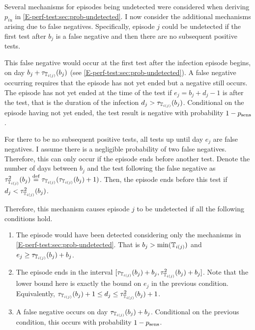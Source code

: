 \documentclass[thesis.tex]{subfiles}
\begin{document}
Several mechanisms for episodes being undetected were considered when deriving $p_{iu}$ in \cref{E-perf-test:sec:prob-undetected}.
I now consider the additional mechanisms arising due to false negatives.
Specifically, episode $j$ could be undetected if the first test after $b_j$ is a false negative and then there are no subsequent positive tests.

This false negative would occur at the first test after the infection episode begins, on day $b_j + \tau_{\mathbb{T}_{i(j)}}(b_j)$ (see \cref{E-perf-test:sec:prob-undetected}).
A false negative occurring requires that the episode has not yet ended but a negative still occurs.
The episode has not yet ended at the time of the test if $e_j = b_j + d_j - 1$ is after the test, that is the duration of the infection $d_j > \tau_{\mathbb{T}_{i(j)}}(b_j)$.
Conditional on the episode having not yet ended, the test result is negative with probability $1 - p_\text{sens}$.

For there to be no subsequent positive tests, all tests up until day $e_j$ are false negatives.
I assume there is a negligible probability of two false negatives.
Therefore, this can only occur if the episode ends before another test.
Denote the number of days between $b_j$ and the test following the false negative as $\tau^2_{\mathbb{T}_{i(j)}}(b_j) \stackrel{\text{def}}{=} \tau_{\mathbb{T}_{i(j)}}(\tau_{\mathbb{T}_{i(j)}}(b_j) + 1)$.
Then, the episode ends before this test if $d_j < \tau^2_{\mathbb{T}_{i(j)}}(b_j)$.

Therefore, this mechanism causes episode $j$ to be undetected if all the following conditions hold.
\begin{enumerate}
    \item The episode would have been detected considering only the mechanisms in \cref{E-perf-test:sec:prob-undetected}. That is $b_j > \min(\mathbb{T}_{i(j)})$ and $e_j \geq \tau_{\mathbb{T}_{i(j)}}(b_j) + b_j$.
    \item The episode ends in the interval $[\tau_{\mathbb{T}_{i(j)}}(b_j) + b_j, \tau^2_{\mathbb{T}_{i(j)}}(b_j) + b_j]$.
      Note that the lower bound here is exactly the bound on $e_j$ in the previous condition.
      Equivalently, $\tau_{\mathbb{T}_{i(j)}}(b_j) + 1 \leq d_j \leq \tau^2_{\mathbb{T}_{i(j)}}(b_j) + 1$.
    \item A false negative occurs on day $\tau_{\mathbb{T}_{i(j)}}(b_j) + b_j$. Conditional on the previous condition, this occurs with probability $1 - p_\text{sens}$.
\end{enumerate}
\end{document}
